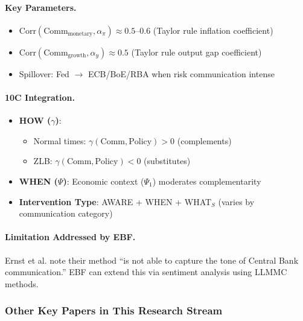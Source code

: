 \paragraph{Key Parameters.}
\begin{itemize}[nosep]
  \item $\text{Corr}(\text{Comm}_{\text{monetary}}, \alpha_{\pi}) \approx 0.5\text{--}0.6$ (Taylor rule inflation coefficient)
  \item $\text{Corr}(\text{Comm}_{\text{growth}}, \alpha_y) \approx 0.5$ (Taylor rule output gap coefficient)
  \item Spillover: Fed $\rightarrow$ ECB/BoE/RBA when risk communication intense
\end{itemize}

\paragraph{10C Integration.}
\begin{itemize}[nosep]
  \item \textbf{HOW ($\gamma$)}:
    \begin{itemize}[nosep]
      \item Normal times: $\gamma(\text{Comm}, \text{Policy}) > 0$ (complements)
      \item ZLB: $\gamma(\text{Comm}, \text{Policy}) < 0$ (substitutes)
    \end{itemize}
  \item \textbf{WHEN ($\Psi$)}: Economic context ($\Psi_1$) moderates complementarity
  \item \textbf{Intervention Type}: AWARE + WHEN + WHAT$_S$ (varies by communication category)
\end{itemize}

\paragraph{Limitation Addressed by EBF.}
Ernst et al. note their method ``is not able to capture the tone of Central Bank communication.''
EBF can extend this via sentiment analysis using LLMMC methods.

\subsubsection{Other Key Papers in This Research Stream}

